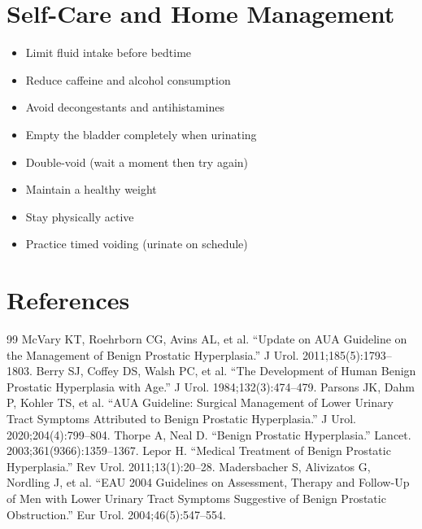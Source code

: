 \section*{Self-Care and Home Management}
\begin{itemize}
\item Limit fluid intake before bedtime
\item Reduce caffeine and alcohol consumption
\item Avoid decongestants and antihistamines
\item Empty the bladder completely when urinating
\item Double-void (wait a moment then try again)
\item Maintain a healthy weight
\item Stay physically active
\item Practice timed voiding (urinate on schedule)
\end{itemize}

\section*{References}
\begin{thebibliography}{99}
 McVary KT, Roehrborn CG, Avins AL, et al. ``Update on AUA Guideline on the Management of Benign Prostatic Hyperplasia.'' J Urol. 2011;185(5):1793--1803.
 Berry SJ, Coffey DS, Walsh PC, et al. ``The Development of Human Benign Prostatic Hyperplasia with Age.'' J Urol. 1984;132(3):474--479.
 Parsons JK, Dahm P, Kohler TS, et al. ``AUA Guideline: Surgical Management of Lower Urinary Tract Symptoms Attributed to Benign Prostatic Hyperplasia.'' J Urol. 2020;204(4):799--804.
 Thorpe A, Neal D. ``Benign Prostatic Hyperplasia.'' Lancet. 2003;361(9366):1359--1367.
 Lepor H. ``Medical Treatment of Benign Prostatic Hyperplasia.'' Rev Urol. 2011;13(1):20--28.
 Madersbacher S, Alivizatos G, Nordling J, et al. ``EAU 2004 Guidelines on Assessment, Therapy and Follow-Up of Men with Lower Urinary Tract Symptoms Suggestive of Benign Prostatic Obstruction.'' Eur Urol. 2004;46(5):547--554.
\end{thebibliography}
